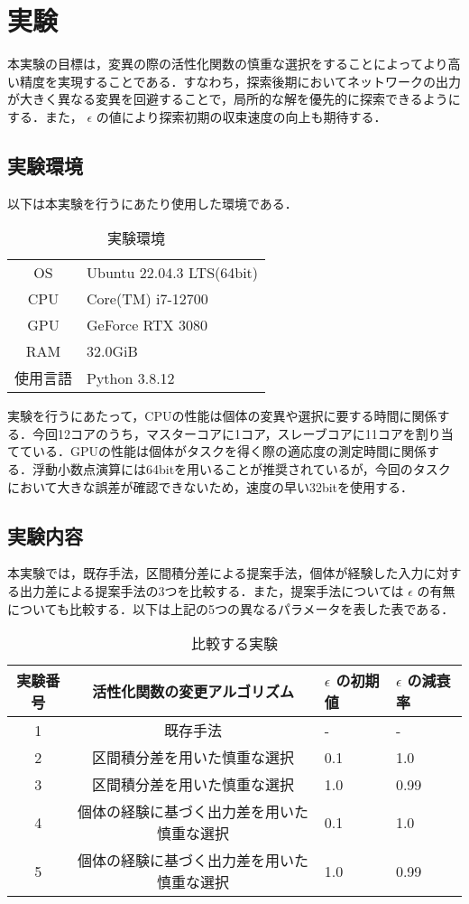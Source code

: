 \section{実験}
本実験の目標は，変異の際の活性化関数の慎重な選択をすることによってより高い精度を実現することである．すなわち，探索後期においてネットワークの出力が大きく異なる変異を回避することで，局所的な解を優先的に探索できるようにする．また， $ \epsilon $ の値により探索初期の収束速度の向上も期待する．

\subsection{実験環境}
以下は本実験を行うにあたり使用した環境である．

\begin{table}[h]
    \caption{実験環境}
    \centering
    \begin{tabular}{cl}
        \hline
        OS & Ubuntu 22.04.3 LTS(64bit) \\
        CPU & Core(TM) i7-12700 \\
        GPU & GeForce RTX 3080 \\
        RAM & 32.0GiB \\
        使用言語 & Python 3.8.12 \\
        \hline
    \end{tabular}
\end{table}

実験を行うにあたって，CPUの性能は個体の変異や選択に要する時間に関係する．今回12コアのうち，マスターコアに1コア，スレーブコアに11コアを割り当てている．GPUの性能は個体がタスクを得く際の適応度の測定時間に関係する．浮動小数点演算には64bitを用いることが推奨されているが，今回のタスクにおいて大きな誤差が確認できないため，速度の早い32bitを使用する．

\subsection{実験内容}
本実験では，既存手法，区間積分差による提案手法，個体が経験した入力に対する出力差による提案手法の3つを比較する．また，提案手法については $ \epsilon $ の有無についても比較する．以下は上記の5つの異なるパラメータを表した表である．

\begin{table}[h]
    \caption{比較する実験}
    \centering
    \begin{tabular}{ccll}
        \hline
        実験番号  & 活性化関数の変更アルゴリズム & $ \epsilon $ の初期値 & $ \epsilon $ の減衰率 \\
        \hline \hline
        1 & 既存手法 & - & - \\
        2 & 区間積分差を用いた慎重な選択 & 0.1 & 1.0 \\
        3 & 区間積分差を用いた慎重な選択 & 1.0 & 0.99 \\
        4 & 個体の経験に基づく出力差を用いた慎重な選択 & 0.1 & 1.0 \\
        5 & 個体の経験に基づく出力差を用いた慎重な選択 & 1.0 & 0.99 \\
        \hline
    \end{tabular}
\end{table}

